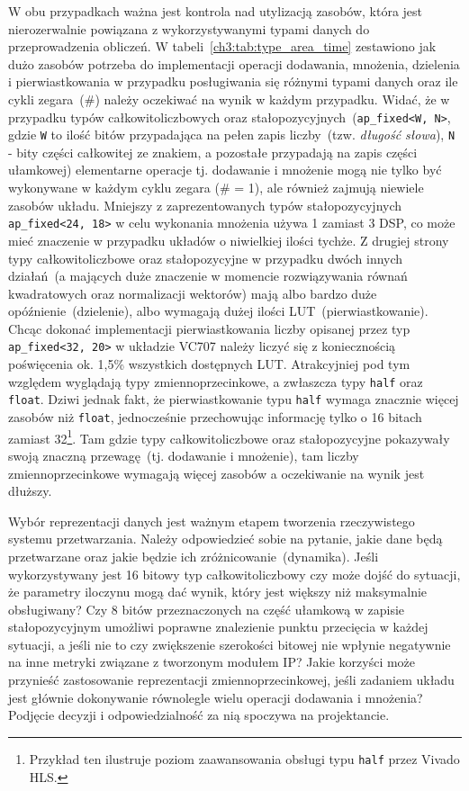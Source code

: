 W obu przypadkach ważna jest kontrola nad utylizacją zasobów, która jest nierozerwalnie powiązana z wykorzystywanymi typami danych do przeprowadzenia obliczeń. W tabeli~\ref{ch3:tab:type_area_time} zestawiono jak dużo zasobów potrzeba do implementacji operacji dodawania, mnożenia, dzielenia i pierwiastkowania w przypadku posługiwania się różnymi typami danych oraz ile cykli zegara~(\#) należy oczekiwać na wynik w każdym przypadku. Widać, że w przypadku typów całkowitoliczbowych oraz stałopozycyjnych~(\texttt{ap\_fixed<W, N>}, gdzie \texttt{W} to ilość bitów przypadająca na pełen zapis liczby~(tzw. \textit{długość słowa}), \texttt{N} - bity części całkowitej ze znakiem, a pozostałe przypadają na zapis części ułamkowej) elementarne operacje tj. dodawanie i mnożenie mogą nie tylko być wykonywane w każdym cyklu zegara (\# = 1), ale również zajmują niewiele zasobów układu. Mniejszy z zaprezentowanych typów stałopozycyjnych \texttt{ap\_fixed\textless{}24, 18\textgreater{}} w celu wykonania mnożenia używa 1 zamiast 3 DSP, co może mieć znaczenie w przypadku układów o niwielkiej ilości tychże. Z drugiej strony typy całkowitoliczbowe oraz stałopozycyjne w przypadku dwóch innych działań~(a mających duże znaczenie w momencie rozwiązywania równań kwadratowych oraz normalizacji wektorów) mają albo bardzo duże opóźnienie~(dzielenie), albo wymagają dużej ilości LUT~(pierwiastkowanie). Chcąc dokonać implementacji pierwiastkowania liczby opisanej przez typ \texttt{ap\_fixed\textless{}32, 20\textgreater{}} w układzie VC707 należy liczyć się z koniecznością poświęcenia ok. 1,5\% wszystkich dostępnych LUT. Atrakcyjniej pod tym względem wyglądają typy zmiennoprzecinkowe, a zwłaszcza typy \texttt{half} oraz \texttt{float}. Dziwi jednak fakt, że pierwiastkowanie typu \texttt{half} wymaga znacznie więcej zasobów niż \texttt{float}, jednocześnie przechowując informację tylko o 16 bitach zamiast 32\footnote{Przykład ten ilustruje poziom zaawansowania obsługi typu \texttt{half} przez Vivado HLS.}. Tam gdzie typy całkowitoliczbowe oraz stałopozycyjne pokazywały swoją znaczną przewagę~(tj. dodawanie i mnożenie), tam liczby zmiennoprzecinkowe wymagają więcej zasobów a oczekiwanie na wynik jest dłuższy.  

Wybór reprezentacji danych jest ważnym etapem tworzenia rzeczywistego systemu przetwarzania. Należy odpowiedzieć sobie na pytanie, jakie dane będą przetwarzane oraz jakie będzie ich zróżnicowanie~(dynamika). Jeśli wykorzystywany jest 16 bitowy typ całkowitoliczbowy czy może dojść do sytuacji, że parametry iloczynu mogą dać wynik, który jest większy niż maksymalnie obsługiwany? Czy 8 bitów przeznaczonych na część ułamkową w zapisie stałopozycyjnym umożliwi poprawne znalezienie punktu przecięcia w każdej sytuacji, a jeśli nie to czy zwiększenie szerokości bitowej nie wpłynie negatywnie na inne metryki związane z tworzonym modułem IP? Jakie korzyści może przynieść zastosowanie reprezentacji zmiennoprzecinkowej, jeśli zadaniem układu jest głównie dokonywanie równolegle wielu operacji dodawania i mnożenia?  Podjęcie decyzji i odpowiedzialność za nią spoczywa na projektancie.

